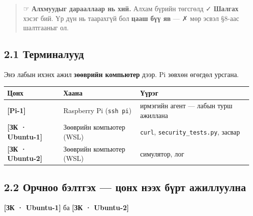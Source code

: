 \begin{quote}
☞ \textbf{Алхмуудыг дарааллаар нь хий.} Алхам бүрийн төгсгөлд ✓ \textbf{Шалгах} хэсэг бий. Үр дүн нь таарахгүй бол \textbf{цааш бүү яв} --- ✗ мөр эсвэл §8-аас шалтгааныг ол.
\end{quote}

\hypertarget{ux442ux435ux440ux43cux438ux43dux430ux43bux443ux443ux434}{%
\subsection{2.1 Терминалууд}\label{ux442ux435ux440ux43cux438ux43dux430ux43bux443ux443ux434}}

Энэ лабын ихэнх ажил \textbf{зөөврийн компьютер} дээр. Pi зөвхөн өгөгдөл урсгана.

\begingroup\scriptsize\begin{longtable}[]{@{}lll@{}}
\toprule
Цонх & Хаана & Үүрэг\tabularnewline
\midrule
\endhead
\textbf{{[}Pi-1{]}} & Raspberry Pi (\texttt{ssh\ pi}) & ирмэгийн агент --- лабын турш ажиллана\tabularnewline
\textbf{{[}ЗК · Ubuntu-1{]}} & Зөөврийн компьютер (WSL) & \texttt{curl}, \texttt{security\_\allowbreak{}tests.\allowbreak{}py}, засвар\tabularnewline
\textbf{{[}ЗК · Ubuntu-2{]}} & Зөөврийн компьютер (WSL) & симулятор, лог\tabularnewline
\bottomrule
\end{longtable}\endgroup

\hypertarget{ux43eux440ux447ux43dux43eux43e-ux431ux44dux43bux442ux433ux44dux445-ux446ux43eux43dux445-ux43dux44dux44dux445-ux431ux4afux440ux442-ux430ux436ux438ux43bux43bux443ux443ux43bux43dux430}{%
\subsection{\texorpdfstring{2.2 Орчноо бэлтгэх --- \textbf{цонх нээх бүрт} ажиллуулна}{2.2 Орчноо бэлтгэх --- цонх нээх бүрт ажиллуулна}}\label{ux43eux440ux447ux43dux43eux43e-ux431ux44dux43bux442ux433ux44dux445-ux446ux43eux43dux445-ux43dux44dux44dux445-ux431ux4afux440ux442-ux430ux436ux438ux43bux43bux443ux443ux43bux43dux430}}

\textbf{{[}ЗК · Ubuntu-1{]}} ба \textbf{{[}ЗК · Ubuntu-2{]}}

\begin{Shaded}
\begin{Highlighting}[]
\KeywordTok{\&\&} 
 \KeywordTok{\{} \KeywordTok{\textbackslash{}}
   \KeywordTok{\textbackslash{}}
  \KeywordTok{\textbackslash{}}
  \KeywordTok{|} \KeywordTok{;} \KeywordTok{\}}
\end{Highlighting}
\end{Shaded}

